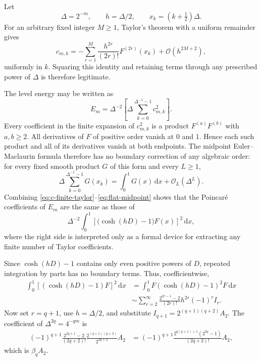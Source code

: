 \documentclass[11pt,oneside]{article}
\theoremstyle{definition}
\theoremstyle{remark}
\newcommand{\dd}{\,\mathrm d}
\newcommand{\bigO}{\mathcal O}
\newcommand{\1}{\mathbf 1}
\begin{document}
Let
\begin{equation}
 \Delta=2^{-m},\qquad h=\Delta/2,
 \qquad x_k=(k+\tfrac12)\Delta.                          \label{eq:appendix-delta}
\end{equation}
For an arbitrary fixed integer $M\ge1$, Taylor's theorem with a uniform
remainder gives
\begin{equation}
 c_{m,k}=-\sum_{r=1}^{M}
 \frac{h^{2r}}{(2r)!}F^{(2r)}(x_k)
 +\bigO(h^{2M+2}),                                       \label{eq:c-finite-taylor}
\end{equation}
uniformly in $k$.  Squaring this identity and retaining terms through any
prescribed power of $\Delta$ is therefore legitimate.

The level energy may be written as
\begin{equation}
 E_m=\Delta^{-2}
 \left[\Delta\sum_{k=0}^{\Delta^{-1}-1}c_{m,k}^2\right]. \label{eq:Em-midpoint}
\end{equation}
Every coefficient in the finite expansion of $c_{m,k}^2$ is a product
$F^{(a)}F^{(b)}$ with $a,b\ge2$.  All derivatives of $F$ of positive order
vanish at $0$ and $1$.  Hence each such product and all of its derivatives
vanish at both endpoints.  The midpoint Euler--Maclaurin formula therefore
has no boundary correction of any algebraic order: for every fixed smooth
product $G$ of this form and every $L\ge1$,
\begin{equation}
 \Delta\sum_{k=0}^{\Delta^{-1}-1}G(x_k)
 =\int_0^1G(x)\dd x+\bigO_L(\Delta^L).                  \label{eq:flat-midpoint}
\end{equation}
Combining \eqref{eq:c-finite-taylor}--\eqref{eq:flat-midpoint} shows that the
Poincaré coefficients of $E_m$ are the same as those of
\begin{equation}
 \Delta^{-2}\int_0^1
 \left[\bigl(\cosh(hD)-1\bigr)F(x)\right]^2\dd x,       \label{eq:operator-asymptotic}
\end{equation}
where the right side is interpreted only as a formal device for extracting
any finite number of Taylor coefficients.

Since $\cosh(hD)-1$ contains only even positive powers of $D$, repeated
integration by parts has no boundary terms.  Thus, coefficientwise,
\begin{align}
 \int_0^1[(\cosh(hD)-1)F]^2\dd x
 &=\int_0^1F(\cosh(hD)-1)^2F\dd x                       \label{eq:operator-square}\\
 &\sim\sum_{r=2}^\infty
 \frac{2^{2r-1}-2}{(2r)!}h^{2r}(-1)^rI_r.               \label{eq:operator-coeff}
\end{align}
Now set $r=q+1$, use $h=\Delta/2$, and substitute
$I_{q+1}=2^{(q+1)(q+2)}A_2$.  The coefficient of
$\Delta^{2q}=4^{-qm}$ is
\begin{align}
 (-1)^{q+1}
 \frac{2^{2q+1}-2}{(2q+2)!}
 \frac{2^{(q+1)(q+2)}}{2^{2q+2}}A_2
 &=(-1)^{q+1}
 \frac{2^{q(q+1)+1}(2^{2q}-1)}{(2q+2)!}A_2,            \label{eq:beta-derivation}
\end{align}
which is $\beta_qA_2$.
\end{document}
